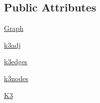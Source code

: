 \subsection*{Public Attributes}
\begin{DoxyCompactItemize}
\item 
\hyperlink{classnetworkx_1_1classes_1_1tests_1_1test__multigraph_1_1TestMultiGraph_a2e3d0711278fa988a03b3a79722ff2c1}{Graph}
\item 
\hyperlink{classnetworkx_1_1classes_1_1tests_1_1test__multigraph_1_1TestMultiGraph_af6acc7fa2c85bfa987e087eb4043821a}{k3adj}
\item 
\hyperlink{classnetworkx_1_1classes_1_1tests_1_1test__multigraph_1_1TestMultiGraph_a49b81fdda32a7cdb33d86c4c8b647271}{k3edges}
\item 
\hyperlink{classnetworkx_1_1classes_1_1tests_1_1test__multigraph_1_1TestMultiGraph_a98d0886e2e55f1566efb91577b5f8fd6}{k3nodes}
\item 
\hyperlink{classnetworkx_1_1classes_1_1tests_1_1test__multigraph_1_1TestMultiGraph_a33b8cdc1f9562508ce384c8fb19cc4e6}{K3}
\end{DoxyCompactItemize}
